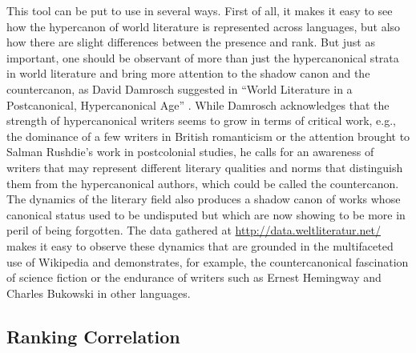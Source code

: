 \documentclass[a4paper,12pt]{scrartcl}
\begin{document}


This tool can be put to use in several ways. First of all, it makes it easy
to see how the hypercanon of world literature is represented across languages,
but also how there are slight differences between the presence and rank. But
just as important, one should be observant of more than just the
hypercanonical strata in world literature and bring more attention to the
shadow canon and the countercanon, as David Damrosch suggested in
``World Literature in a Postcanonical, Hypercanonical Age''
\cite{damrosch2006postcanonical}. While Damrosch acknowledges that the
strength of hypercanonical writers seems to grow in terms of critical work,
e.g., the dominance of a few writers in British romanticism or the attention
brought to Salman Rushdie’s work in postcolonial studies, he calls for an
awareness of writers that may represent different literary qualities and
norms that distinguish them from the hypercanonical authors, which could
be called the countercanon. The dynamics of the literary field also
produces a shadow canon of works whose canonical status used to be
undisputed but which are now showing to be more in peril of being
forgotten. The data gathered at \url{http://data.weltliteratur.net/} makes it
easy to observe these dynamics that are grounded in the multifaceted use
of Wikipedia and demonstrates, for example, the countercanonical
fascination of science fiction or the endurance of writers such as Ernest
Hemingway and Charles Bukowski in other languages.













\subsection{Ranking Correlation}\label{sec:ranking-correlation}
\end{document}
